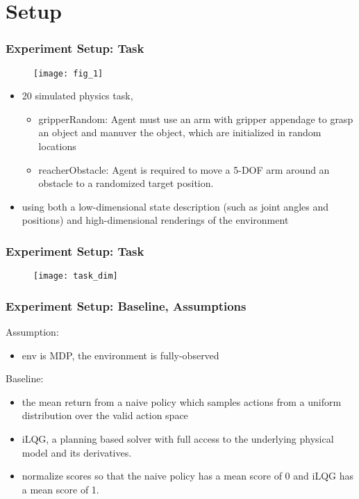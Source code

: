 \section{Setup}

\begin{frame}
\frametitle{Experiment Setup: Task}

\begin{figure}
    \centering
    \texttt{[image: fig\_1]}
\end{figure}

\begin{itemize}
  \item 20 simulated physics task,
  \begin{itemize}
    \item gripperRandom:
    Agent must use an arm with gripper appendage to grasp an object and manuver the object, which
    are initialized in random locations
    \item reacherObstacle:
    Agent is required to move a 5-DOF arm around an obstacle to a randomized target position.
  \end{itemize}
  \item using both a low-dimensional state description (such as joint angles and positions) and high-dimensional renderings of the environment
\end{itemize}

\end{frame}

\begin{frame}
\frametitle{Experiment Setup: Task}

\begin{figure}
    \centering
    \texttt{[image: task\_dim]}
\end{figure}

\end{frame}


\begin{frame}
\frametitle{Experiment Setup: Baseline, Assumptions}

Assumption:
\begin{itemize}
  \item env is MDP, the environment is fully-observed
\end{itemize}

Baseline:
\begin{itemize}
  \item the mean return from a naive policy which samples actions from
  a uniform distribution over the valid action space
  \item iLQG, a planning based solver with full access to
  the underlying physical model and its derivatives.
  \item normalize scores so that the naive policy has
  a mean score of 0 and iLQG has a mean score of 1.
\end{itemize}

\end{frame}

